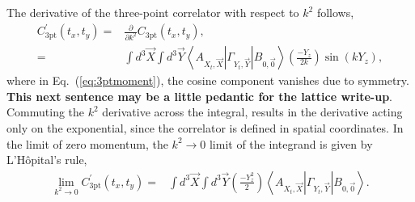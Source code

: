 \documentclass{PoS}
\newcommand{\dgr}[1]{\textcolor{David}{#1}}
\begin{document}
The derivative of the three-point correlator with respect to $k^2$ follows,
\begin{align}
C^\prime_{\text{3pt}}(t_x, t_y) = &\frac{\partial}{\partial k^2}C_{\text{3pt}}(t_x, t_y),\nonumber\\
=& \int d^3\vec{X} \int d^3\vec{Y} \left<A_{X_t,\vec{X}}|\Gamma_{Y_t,\vec{Y}} |B_{0,\vec{0}}\right> \left(\frac{-Y_z}{2k}\right)\sin\left(kY_z\right),
\label{eq:3ptmoment}
\end{align}
where in Eq.~(\ref{eq:3ptmoment}), the cosine component vanishes due
to symmetry. \dgr{\bfseries This next sentence may be a little
  pedantic for the lattice write-up}.  Commuting the $k^2$ derivative
across the integral, results in the derivative acting only on the
exponential, since the correlator is defined in spatial
coordinates. In the limit of zero momentum, the $k^2 \rightarrow 0$
limit of the integrand is given by L'H\^opital's rule,
\begin{align}
\lim_{k^2 \rightarrow 0} C^\prime_{\text{3pt}}(t_x, t_y) = & \int d^3\vec{X} \int d^3\vec{Y}\left(\frac{-Y_z^2}{2}\right)\left<A_{X_t,\vec{X}}|\Gamma_{Y_t,\vec{Y}} |B_{0,\vec{0}}\right>.
\label{eq:3ptmoment0}
\end{align}

\end{document}

